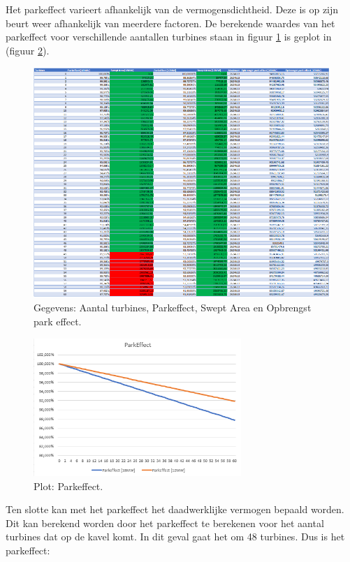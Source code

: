 Het parkeffect varieert afhankelijk van de vermogensdichtheid. Deze is op zijn beurt weer afhankelijk van meerdere factoren. De berekende waardes van het parkeffect voor verschillende aantallen turbines staan in figuur \ref{fig:Parkeffect_table} is geplot in (figuur \ref{fig:ParkEffectGraph}). 

\begin{figure}[H]
\centering
\includegraphics[width=1\textwidth]{IMG/data/overzicht/Parkeffect.PNG}
\caption{Gegevens: Aantal turbines, Parkeffect, Swept Area en Opbrengst park effect.}
\label{fig:Parkeffect_table}
\end{figure}

\begin{figure}[H]
\centering
\includegraphics[width=0.7\textwidth]{IMG/data/overzicht/parkeffect_graph.PNG}
\caption{Plot: Parkeffect.}
\label{fig:ParkEffectGraph}
\end{figure}

Ten slotte kan met het parkeffect het daadwerklijke vermogen bepaald worden. Dit kan berekend worden door het parkeffect te berekenen voor het aantal turbines dat op de kavel komt. In dit geval gaat het om 48 turbines. Dus is het parkeffect: 

